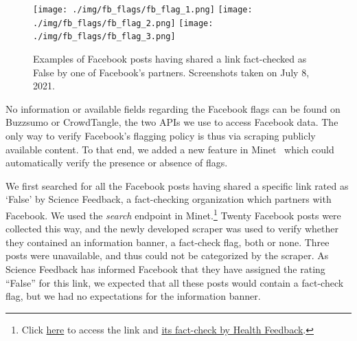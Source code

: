 \documentclass{article}
\begin{document}
\begin{figure}[h]
\centering
\texttt{[image: ./img/fb\_flags/fb\_flag\_1.png]}
\texttt{[image: ./img/fb\_flags/fb\_flag\_2.png]}
\texttt{[image: ./img/fb\_flags/fb\_flag\_3.png]}
\caption{Examples of Facebook posts having shared a link fact-checked as False by one of Facebook’s partners. Screenshots taken on July 8, 2021.} 
\label{fb_flags}
\end{figure}
No information or available fields regarding the Facebook flags can be found on Buzzsumo or CrowdTangle, the two APIs we use to access Facebook data. The only way to verify Facebook’s flagging policy is thus via scraping publicly available content. To that end, we added a new feature in Minet~\cite{minet} which could automatically verify the presence or absence of flags.

We first searched for all the Facebook posts having shared a specific link rated as ‘False’ by Science Feedback, a fact-checking organization which partners with Facebook. We used the {\it search} endpoint in Minet.\footnote{ Click \href{https://beforeitsnews.com/eu/2021/04/stay-away-from-the-vaxxed-it-is-official-from-pfizers-own-documents-2671454.html}{here} to access the link and  \href{https://healthfeedback.org/claimreview/insufficient-evidence-to-claim-covid-19-vaccines-cause-menstrual-irregularities-in-vaccinated-women-vaccinated-people-arent-making-unvaccinated-people-ill/}{its fact-check by Health Feedback}.} 
Twenty Facebook posts were collected this way, and the newly developed scraper was used to verify whether they contained an information banner, a fact-check flag, both or none. Three posts were unavailable, and thus could not be categorized by the scraper. As Science Feedback has informed Facebook that they have assigned the rating ``False'' for this link, we expected that all these posts would contain a fact-check flag, but we had no expectations for the information banner. 
\end{document}
